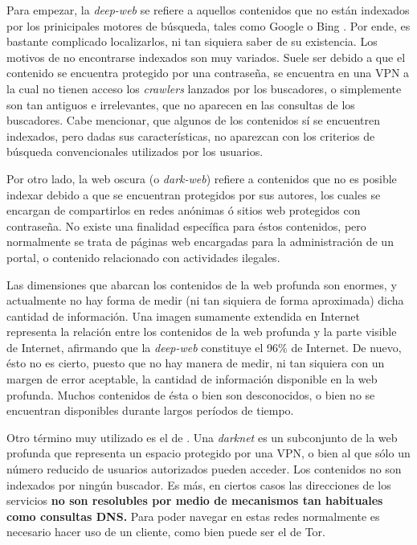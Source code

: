 Para empezar, la \textit{deep-web} se refiere a aquellos contenidos
que no están indexados por los prinicipales motores de búsqueda, tales
como Google o Bing . Por ende, es bastante complicado localizarlos, ni
tan siquiera saber de su existencia.  Los motivos de no encontrarse
indexados son muy variados. Suele ser debido a que el contenido se
encuentra protegido por una contraseña, se encuentra en una VPN a la
cual no tienen acceso los \textit{crawlers} lanzados por los
buscadores, o simplemente son tan antiguos e irrelevantes, que no
aparecen en las consultas de los buscadores.  Cabe mencionar, que
algunos de los contenidos sí se encuentren indexados, pero dadas sus
características, no aparezcan con los criterios de búsqueda
convencionales utilizados por los usuarios.

Por otro lado, la web oscura (o \textit{dark-web}) refiere a
contenidos que no es posible indexar debido a que se encuentran
protegidos por sus autores, los cuales se encargan de compartirlos en
redes anónimas ó sitios web protegidos con contraseña.  No existe una
finalidad específica para éstos contenidos, pero normalmente se trata
de páginas web encargadas para la administración de un portal, o
contenido relacionado con actividades ilegales.

Las dimensiones que abarcan los contenidos de la web profunda son
enormes, y actualmente no hay forma de medir (ni tan siquiera de forma
aproximada) dicha cantidad de información.  Una imagen sumamente
extendida en Internet representa la relación entre los contenidos de
la web profunda y la parte visible de Internet, afirmando que la
\textit{deep-web} constituye el 96\% de Internet. De nuevo, ésto no es
cierto, puesto que no hay manera de medir, ni tan siquiera con un
margen de error aceptable, la cantidad de información disponible en la
web profunda. Muchos contenidos de ésta o bien son desconocidos, o
bien no se encuentran disponibles durante largos períodos de tiempo.

Otro término muy utilizado es el de 
. Una
\textit{darknet }es un subconjunto de la web profunda que representa
un espacio protegido por una VPN, o bien al que sólo un número
reducido de usuarios autorizados pueden acceder. Los contenidos no son
indexados por ningún buscador. Es más, en ciertos casos las
direcciones de los servicios \textbf{no son resolubles por medio de
  mecanismos tan habituales como consultas DNS.} Para poder navegar en
estas redes normalmente es necesario hacer uso de un cliente, como
bien puede ser el de Tor.

